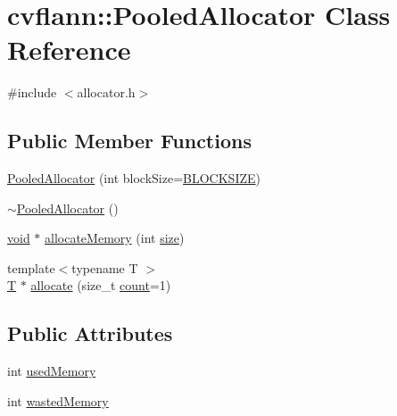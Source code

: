 \hypertarget{classcvflann_1_1PooledAllocator}{\section{cvflann\-:\-:Pooled\-Allocator Class Reference}
\label{classcvflann_1_1PooledAllocator}
}


{\ttfamily \#include $<$allocator.\-h$>$}

\subsection*{Public Member Functions}
\begin{DoxyCompactItemize}
\item 
\hyperlink{classcvflann_1_1PooledAllocator_a1e83a3e496a4c8dbb75a914e15aec3e7}{Pooled\-Allocator} (int block\-Size=\hyperlink{namespacecvflann_af6813d97f5ad15bea15d4c914d406e24}{B\-L\-O\-C\-K\-S\-I\-Z\-E})
\item 
\hyperlink{classcvflann_1_1PooledAllocator_a42f5f1dd670ee793ea352234f8a3ec80}{$\sim$\-Pooled\-Allocator} ()
\item 
\hyperlink{legacy_8hpp_a8bb47f092d473522721002c86c13b94e}{void} $\ast$ \hyperlink{classcvflann_1_1PooledAllocator_add19ffd7aeb8146c7951071c51398c1b}{allocate\-Memory} (int \hyperlink{legacy_8hpp_ae97003f8d5c64cdfb99f6f2606d121b6}{size})
\item 
{\footnotesize template$<$typename T $>$ }\\\hyperlink{calib3d_8hpp_a3efb9551a871ddd0463079a808916717}{T} $\ast$ \hyperlink{classcvflann_1_1PooledAllocator_aaf127cab57cd0e0f4d3b335efd8d3a67}{allocate} (size\-\_\-t \hyperlink{tracking_8hpp_a88d78b1935cd8bdee70a44eaaf326b1e}{count}=1)
\end{DoxyCompactItemize}
\subsection*{Public Attributes}
\begin{DoxyCompactItemize}
\item 
int \hyperlink{classcvflann_1_1PooledAllocator_a6e5510ec11212e0bb1b109b3af09e172}{used\-Memory}
\item 
int \hyperlink{classcvflann_1_1PooledAllocator_af69edd6191138a563f9205d1db7bdd18}{wasted\-Memory}
\end{DoxyCompactItemize}


